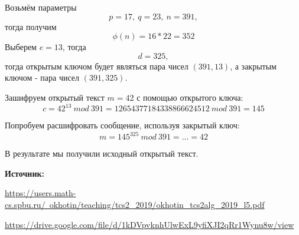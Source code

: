 \documentclass[12pt,a4paper]{scrartcl}
\begin{document}
Возьмём параметры  $$p=17,\ q=23,\ n=391,$$ тогда получим $$\phi (n) = 16*22=352$$
Выберем $e=13$, тогда $$d=325,$$ 
тогда открытым ключом будет являться пара чисел $(391,13)$, а закрытым ключом - пара чисел $(391,325)$.

Зашифруем открытый текст $m=42$ с помощью открытого ключа:
$$c=42^{13}\ mod\ 391 = 12654377184338866624512\ mod\ 391 = 145$$

Попробуем расшифровать сообщение, используя закрытый ключ:
$$m=145^{325}\ mod\ 391=...=42$$

В результате мы получили исходный открытый текст.

\textbf{Источник:}

\href{https://users.math-cs.spbu.ru/~okhotin/teaching/tcs2_2019/okhotin_tcs2alg_2019_l5.pdf}{https://users.math-cs.spbu.ru/~okhotin/teaching/tcs2\_2019/okhotin\_tcs2alg\_2019\_l5.pdf}

\href{https://drive.google.com/file/d/1kDVpvknhUlwExL9yfiXJI2qRr1Wynu8w/view}{https://drive.google.com/file/d/1kDVpvknhUlwExL9yfiXJI2qRr1Wynu8w/view}
\end{document}
